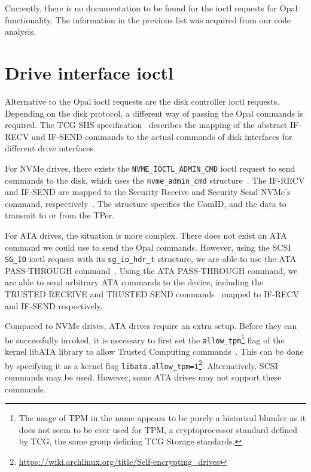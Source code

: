 Currently, there is no documentation to be found for the ioctl requests for Opal functionality. The information in the previous list was acquired from our code analysis.

\section{Drive interface ioctl}
\label{section:direct_communication_raw_ioctl}

Alternative to the Opal ioctl requests are the disk controller ioctl requests. Depending on the disk protocol, a different way of passing the Opal commands is required.
The TCG SIIS specification~\cite{tcg-siis} describes the mapping of the abstract IF-RECV and IF-SEND commands to the actual commands of disk interfaces for different drive interfaces.

For NVMe drives, there exists the \verb|NVME_IOCTL_ADMIN_CMD| ioctl request to send commands to the disk, which uses the \verb|nvme_admin_cmd| structure~\cite{nvme-express-base-specification}. The IF-RECV and IF-SEND are mapped to the Security Receive and Security Send NVMe's command, respectively~\cite{tcg-siis}. The structure specifies the ComID, and the data to transmit to or from the TPer.

For ATA drives, the situation is more complex. There does not exist an ATA command we could use to send the Opal commands.
However, using the SCSI \verb|SG_IO| ioctl request with its \verb|sg_io_hdr_t| structure, we are able to use the ATA PASS-THROUGH command~\cite{ata_passthrough}. Using the ATA PASS-THROUGH command, we are able to send arbitrary ATA commands to the device, including the TRUSTED RECEIVE and TRUSTED SEND commands~\cite{acs-3} mapped to IF-RECV and IF-SEND respectively.

Compared to NVMe drives, ATA drives require an extra setup. Before they can be successfully invoked,  it is necessary to first set the \verb|allow_tpm|\footnote{The usage of TPM in the name appears to be purely a historical blunder as it does not seem to be ever used for TPM, a cryptoprocessor standard defined by TCG, the same group defining TCG Storage standards.} flag of the kernel libATA library to allow Trusted Computing commands~\cite{acs-3}. This can be done by specifying it as a kernel flag \verb|libata.allow_tpm=1|\footnote{\url{https://wiki.archlinux.org/title/Self-encrypting_drives}}.
Alternatively, SCSI commands may be used. However, some ATA drives may not support these commands.

